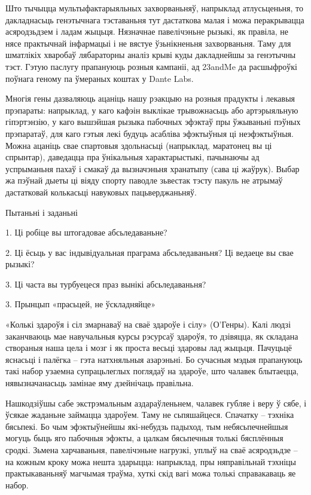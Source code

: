 Што тычыцца мультыфактарыяльных захворваньняў, напрыклад атлусьценьня, то дакладнасьць генэтычнага тэставаньня тут дастаткова малая і можа перакрывацца асяродзьдзем і ладам жыцьця. Нязначнае павелічэньне рызыкі, як правіла, не нясе практычнай інфармацыі і не вястуе ўзьнікненьня захворваньня. Таму для шматлікіх хваробаў лябараторны аналіз крыві куды дакладнейшы за генэтычны тэст. Гэтую паслугу прапануюць розныя кампаніі, ад 23andMe да расшыфроўкі поўнага геному па ўмераных коштах у Dante Labs.

Многія гены дазваляюць ацаніць нашу рэакцыю на розныя прадукты і лекавыя прэпараты: напрыклад, у каго кафэін выклікае трывожнасьць або артэрыяльную гіпэртэнзію, у каго вышэйшая рызыка пабочных эфэктаў пры ўжываньні пэўных прэпаратаў, для каго гэтыя лекі будуць асабліва эфэктыўныя ці неэфэктыўныя. Можна ацаніць свае спартовыя здольнасьці (напрыклад, маратонец вы ці спрынтар), даведацца пра ўнікальныя характарыстыкі, пачынаючы ад успрыманьня пахаў і смакаў да вызначэньня хранатыпу (сава ці жаўрук). Выбар жа пэўнай дыеты ці віяду спорту паводле зьвестак тэсту пакуль не атрымаў дастатковай колькасьці навуковых пацьверджаньняў.

Пытаньні і заданьні

1. Ці робіце вы штогадовае абсьледаваньне?

2. Ці ёсьць у вас індывідуальная праграма абсьледаваньня? Ці ведаеце вы свае рызыкі?

3. Ці часта вы турбуецеся праз вынікі абсьледаваньня?


3. Прынцып «прасьцей, не ўскладняйце»

«Колькі здароўя і сіл змарнаваў на сваё здароўе і сілу» (О'Генры). Калі людзі заканчваюць мае навучальныя курсы рэсурсаў здароўя, то дзівяцца, як складана створаныя наша цела і мозг і як проста весьці здаровы лад жыцьця. Пачуцьцё яснасьці і палёгка – гэта натхняльныя азарэньні. Бо сучасныя мэдыя прапануюць такі набор узаемна супрацьлеглых поглядаў на здароўе, што чалавек блытаецца, нявызначанасьць замінае яму дзейнічаць правільна.

Нашкодзіўшы сабе экстрэмальным аздараўленьнем, чалавек губляе і веру ў сябе, і ўсякае жаданьне займацца здароўем. Таму не сьпяшайцеся. Спачатку – тэхніка бясьпекі. Бо чым эфэктыўнейшы які-небудзь падыход, тым небясьпечнейшыя могуць быць яго пабочныя эфэкты, а цалкам бясьпечныя толькі бясплённыя сродкі. Зьмена харчаваньня, павелічэньне нагрузкі, уплыў на сваё асяродзьдзе – на кожным кроку можа нешта здарыцца: напрыклад, пры няправільнай тэхніцы практыкаваньняў магчымая траўма, хуткі скід вагі можа толькі справакаваць яе набор.

